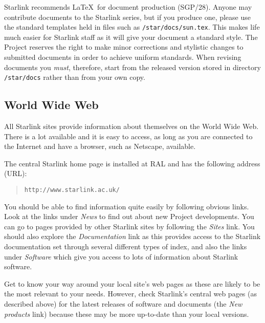 \documentclass[twoside]{article}
\newcommand{\htmladdnormallink}[2]{#1}
\newcommand{\xref}[3]{#1}
\begin{document}
Starlink recommends \LaTeX\ for document production
(\xref{SGP/28}{sgp28}{}).
Anyone may contribute documents to the Starlink series, but if you produce one,
please use the standard templates held in files such as
{\tt /star/docs/sun.tex}.
This makes life much easier for Starlink staff as it will give your document
a standard style.
The Project reserves the right to make minor corrections and stylistic changes
to submitted documents in order to achieve uniform standards.
When revising documents you {\em must}, therefore, start from the released
version stored in directory {\tt /star/docs} rather than from your own copy.

\subsection{World Wide Web}

All
\htmladdnormallink{Starlink sites}{http://www.starlink.ac.uk/sites.html}
provide information about themselves on the World Wide Web.
There is a lot available and it is easy to access, as long as you are
connected to the Internet and have a browser, such as Netscape, available.

The
\htmladdnormallink{central Starlink home page}{http://www.starlink.ac.uk/}
is installed at RAL and has the following address (URL):
\begin{quote}
{\tt http://www.starlink.ac.uk/}
\end{quote}
You should be able to find information quite easily by following obvious
links.
Look at the links under {\em News}\/ to find out about new
Project developments.
You can go to pages provided by other Starlink sites by following the
{\em \htmladdnormallink{Sites}{http://www.starlink.ac.uk/sites.html}}\/ link.
You should also explore the
{\em \htmladdnormallink{Documentation}
{http://www.starlink.ac.uk/docs.html}}\/
link as this provides access to the Starlink documentation set through
several different types of index, and also the links under {\em Software}\/
which give you access to lots of information about Starlink software.

Get to know your way around your local site's web pages as these are likely to
be the most relevant to your needs.
However, check Starlink's central web pages (as described above) for the
latest releases of software and documents (the
{\em \htmladdnormallink{New products}
{http://www.starlink.ac.uk/\~{}cac/publicity/new_products.html}}\/
link)
because these may be more up-to-date than your local versions.
\end{document}
